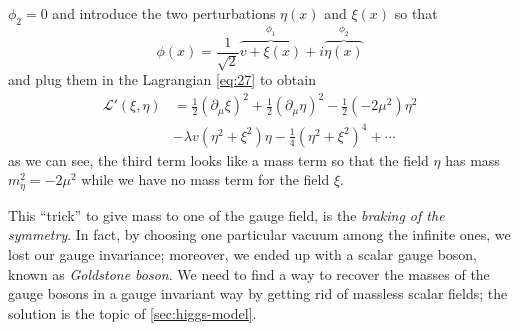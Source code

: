 $\phi_{2} = 0$ and introduce the two perturbations $\eta(x)$ and $\xi(x)$ so
that
\begin{equation}
  \label{eq:30}
  \phi (x) = \frac{1}{\sqrt{2}} \overbrace{v + \xi(x)}^{\phi_{1}} + i
  \overbrace{\eta(x)}^{\phi_{2}}
\end{equation}
and plug them in the Lagrangian \eqref{eq:27} to obtain
\begin{equation}
  \label{eq:31}
  \begin{split}
    \mathcal{L}' (\xi,\eta) &= \frac{1}{2}(\partial_{\mu} \xi)^{2} + \frac{1}{2}
    (\partial_{\mu} \eta)^{2} - \frac{1}{2}(-2 \mu^{2})\eta^{2} \\ &- \lambda v
    (\eta^{2} + \xi^{2}) \eta - \frac{1}{4}(\eta^{2} + \xi^{2})^{4} + \cdots
  \end{split}
\end{equation}
as we can see, the third term looks like a mass term so that the field $\eta$
has mass $m_{\eta}^{2} = -2 \mu^{2}$ while we have no mass term for the field
$\xi$.

This ``trick'' to give mass to one of the gauge field, is the \emph{braking of
  the symmetry}. In fact, by choosing one particular vacuum among the infinite
ones, we lost our gauge invariance; moreover, we ended up with a scalar gauge
boson, known as \emph{Goldstone boson}. We need to find a way to recover the
masses of the gauge bosons in a gauge invariant way by getting rid of massless
scalar fields; the solution is the topic of \cref{sec:higgs-model}.
